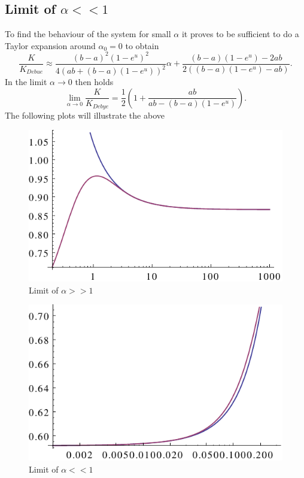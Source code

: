 \subsection{Limit of $\alpha << 1$}
To find the behaviour of the system for small $\alpha$ it proves to be sufficient to do a Taylor expansion around $\alpha_0 = 0$ to obtain
\begin{equation}
    \frac{K}{K_{Debue}} \approx \frac{  (b-a)^2\left(1-e^u\right)^2}{4 \left(ab + (b-a)(1-e^u)\right)^2} \alpha+\frac{(b-a)(1-e^u)-2ab }{2 \left((b-a) \left(1-e^u\right)-ab\right)}.
    \label{ksa}
\end{equation}
In the limit $\alpha \rightarrow 0$ then holds
\begin{equation}
    \lim_{\alpha \rightarrow 0} \frac{K}{K_{Debye}} =\frac{1}{2}\left(1+ \frac{ab}{ab-(b-a) \left(1-e^u\right)}\right).
    \label{klim0a}
\end{equation}
The following plots will illustrate the above \par
\begin{minipage}[t]{0.5 \textwidth}
    \begin{figure}[H]
        \includegraphics[width = 1 \textwidth]{plots/largelimit.pdf}
    \caption{Limit of $\alpha >>1$}
    \end{figure}
\end{minipage}\begin{minipage}[t]{0.49 \textwidth}
    \begin{figure}[H]
        \includegraphics[width = 1 \textwidth]{plots/smalllimit.pdf}
    \caption{Limit of $\alpha <<1$}
    \end{figure}
\end{minipage}
